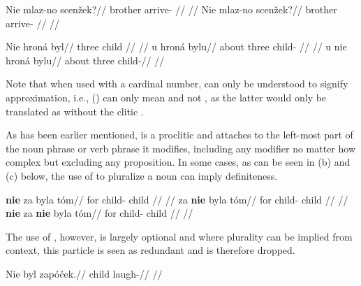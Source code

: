 \pex
\begingl
    \gla Nie mlaz-no scenžek?//
    \glb {} brother arrive- //
    \glft {}//
\endgl
\xe
\pex
\begingl
    \gla Nie mlaz-no scenžek?//
    \glb {} brother arrive- //
    \glft {}//
\endgl
\xe

\pex
\a
\begingl{}
    \gla Nie hroná byl//
    \glb {} three child //
    \glft {}//
\endgl
\a
\begingl
    \gla u hroná bylu//
    \glb about three child- //
    \glft {}//
\endgl
\a
\begingl
    \gla u nie hroná bylu//
    \glb about  three child-//
    \glft {}//
\endgl
\xe

Note that when used with a cardinal number,  can only be understood to signify approximation, i.e., () can only mean  and not , as the latter would only be translated as  without the clitic .

As has been earlier mentioned,  is a proclitic and attaches to the left-most part of the noun phrase or verb phrase it modifies, including any modifier no matter how complex but excluding any proposition. In some cases, as can be seen in (b) and (c) below, the use of  to pluralize a noun can imply definiteness.

\pex
\a
\begingl{}
    \gla \textbf{nie} za byla t\'om//
    \glb {} for child- child //
    \glft {}//
\endgl
\a
\begingl{}
    \gla za \textbf{nie} byla t\'om//
    \glb for  child- child //
    \glft {}//
\endgl
\a
\begingl{}
    \gla \textbf{nie} za \textbf{nie} byla t\'om//
    \glb {} for  child- child //
    \glft {}//
\endgl
\xe





The use of , however, is largely optional and where plurality can be implied from context, this particle is seen as redundant and is therefore dropped.

\pex
\begingl
\gla Nie byl zap\'oček.//
\glb {} child laugh-//
\glft {}//
\endgl
\xe

